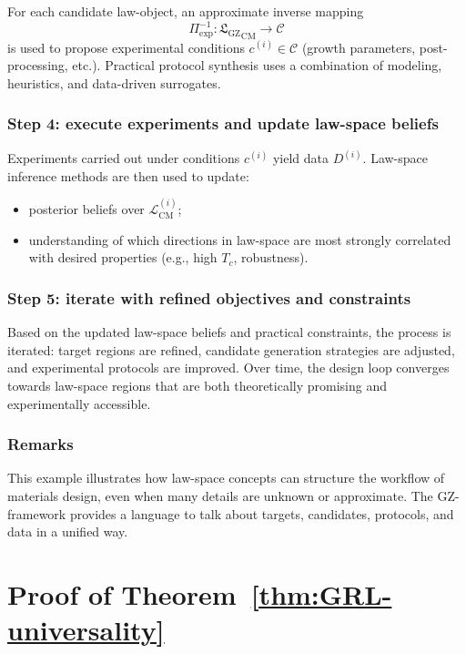 \documentclass[11pt]{book}
\newcommand{\GZLS}{\ensuremath{\mathfrak{L}_{\mathrm{GZ}}}}
\theoremstyle{plain}
\theoremstyle{definition}
\theoremstyle{remark}
\begin{document}
For each candidate law-object, an approximate inverse mapping
\[
   \Pi_{\mathrm{exp}}^{-1} \colon {\GZLS}_{\mathrm{CM}} \to
   \mathcal{C}
\]
is used to propose experimental conditions $c^{(i)} \in \mathcal{C}$
(growth parameters, post-processing, etc.). Practical protocol
synthesis uses a combination of modeling, heuristics, and data-driven
surrogates.

\subsection*{Step 4: execute experiments and update law-space beliefs}

Experiments carried out under conditions $c^{(i)}$ yield data
$D^{(i)}$. Law-space inference methods are then used to update:
\begin{itemize}
  \item posterior beliefs over $\mathcal{L}_{\mathrm{CM}}^{(i)}$;
  \item understanding of which directions in law-space are most
        strongly correlated with desired properties (e.g., high
        $T_c$, robustness).
\end{itemize}

\subsection*{Step 5: iterate with refined objectives and constraints}

Based on the updated law-space beliefs and practical constraints,
the process is iterated: target regions are refined, candidate
generation strategies are adjusted, and experimental protocols are
improved. Over time, the design loop converges towards law-space
regions that are both theoretically promising and experimentally
accessible.

\subsection*{Remarks}

This example illustrates how law-space concepts can structure the
workflow of materials design, even when many details are unknown or
approximate. The GZ-framework provides a language to talk about
targets, candidates, protocols, and data in a unified way.

\chapter{Proof of Theorem~\ref{thm:GRL-universality}}\label{app:GRL-universality-proof}
\end{document}
